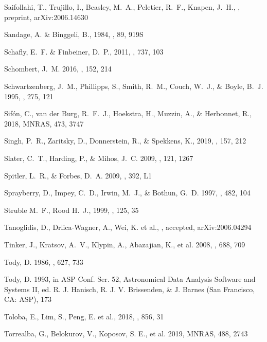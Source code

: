 \documentclass[twocolumn,tighten]{aastex63}
\begin{document}
\begin{thebibliography}{}
Saifollahi, T., Trujillo, I., Beasley, M.~A., Peletier, R.~F., Knapen, J.~H., \mnras, preprint, arXiv:2006.14630

Sandage, A. \& Binggeli, B., 1984, \aj , 89, 919S

Schafly, E.~F. \& Finbeiner, D.~P., 2011, \apj, 737, 103

Schombert, J.~M. 2016, \aj, 152, 214

Schwartzenberg, J.~M., Phillipps, S., Smith, R.~M., Couch, W.~J., \& Boyle, B.~J. 1995, \mnras, 275, 121

Sif\'{o}n, C., van der Burg, R.~F.~J., Hoekstra, H., Muzzin, A., \& Herbonnet, R., 2018, MNRAS, 473, 3747

Singh, P.~R., Zaritsky, D., Donnerstein, R., \& Spekkens, K., 2019, \aj, 157, 212

Slater, C.~T., Harding, P., \& Mihos, J.~C. 2009, \pasp, 121, 1267

Spitler, L.~R., \& Forbes, D.~A. 2009, \mnras, 392, L1

Sprayberry, D., Impey, C.~D., Irwin, M.~J., \& Bothun, G.~D. 1997, \apj, 482, 104

Struble M.~F., Rood H.~J., 1999, \apjs, 125, 35

Tanoglidis, D., Drlica-Wagner, A., Wei, K. et al., \apjs, accepted, arXiv:2006.04294

Tinker, J., Kratsov, A.~V., Klypin, A., Abazajian, K., et al. 2008, \apj, 688, 709

Tody, D. 1986, \procspie, 627, 733

Tody, D. 1993, in ASP Conf. Ser. 52, Astronomical Data Analysis Software and Systems II, ed. R. J. Hanisch, R. J. V. Brissenden, \& J. Barnes (San Francisco, CA: ASP), 173%

Toloba, E., Lim, S., Peng, E. et al., 2018, \apjl, 856, 31

Torrealba, G., Belokurov, V., Koposov, S. E., et al. 2019, MNRAS, 488, 2743


\end{thebibliography}
\end{document}
